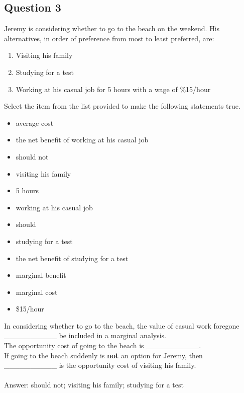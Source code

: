 \subsection{Question 3}
Jeremy is considering whether to go to the beach on the weekend. His alternatives, in order of preference from most to least preferred, are:
\begin{enumerate}
	\item Visiting his family
	\item Studying for a test
	\item Working at his casual job for 5 hours with a wage of \%15/hour
\end{enumerate}
Select the item from the list provided to make the following statements true.
\begin{multicols}{3}
	\begin{itemize}
		\item average cost
		\item the net benefit of working at his casual job
		\item should not
		\item visiting his family
		\item 5 hours
		\item working at his casual job
		\item should
		\item studying for a test
		\item the net benefit of studying for a test
		\item marginal benefit
		\item marginal cost
		\item \$15/hour
	\end{itemize}
\end{multicols}
In considering whether to go to the beach, the value of casual work foregone \_\_\_\_\_\_\_\_\_\_ be included in a marginal analysis.\\
The opportunity cost of going to the beach is \_\_\_\_\_\_\_\_\_\_.\\
If going to the beach suddenly is \textbf{not} an option for Jeremy, then \_\_\_\_\_\_\_\_\_\_ is the opportunity cost of visiting his family.\\\\
Answer: should not; visiting his family; studying for a test


